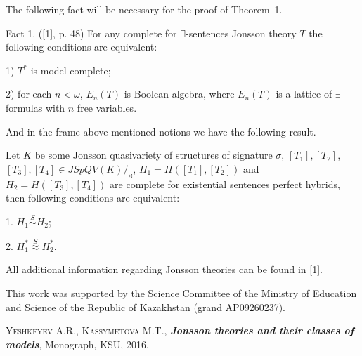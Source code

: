 \documentclass[bsl,meeting]{asl}
\begin{document}
The following fact will be necessary for the proof of Theorem~1.

Fact 1. ([1], p. 48) For any complete for $\exists$-sentences Jonsson theory $T$ the following conditions are equivalent:

1) $T^{*}$ is model complete;

2) for each $n<\omega$, $E_{n}(T)$ is Boolean algebra, where $E_{n}(T)$  is a lattice of $\exists$-formulas with  $n$ free variables.

And in the frame above mentioned notions we have the following result.

\begin{theorem} Let $K$ be some Jonsson quasivariety of structures of signature $\sigma$,
$[T_{1}], [T_{2}]$, $[T_{3}], [T_{4}]  \in JSpQV(K)/_{\bowtie}$, $H_{1}=H([T_{1}],[T_{2}])$ and $H_{2}=H([T_{3}],[T_{4}])$ are complete for existential sentences perfect hybrids, then following conditions are equivalent:

1. $H_{1}\overset{S}\sim H_{2}$;

2. $H_{1}^*\overset{S}\approx H_{2}^*$.
\end{theorem}


All additional information regarding Jonsson theories can be found in [1].

This work was supported by the Science Committee of the Ministry of Education and Science of the Republic of Kazakhstan (grand 
AP09260237).


\begin{thebibliography}{10}




{\scshape Yeshkeyev A.R., Kassymetova M.T.},
{\bfseries\itshape Jonsson theories and their classes of models},
Monograph,
KSU,
2016.



\end{thebibliography}

\vspace*{-0.5\baselineskip}
\end{document}

